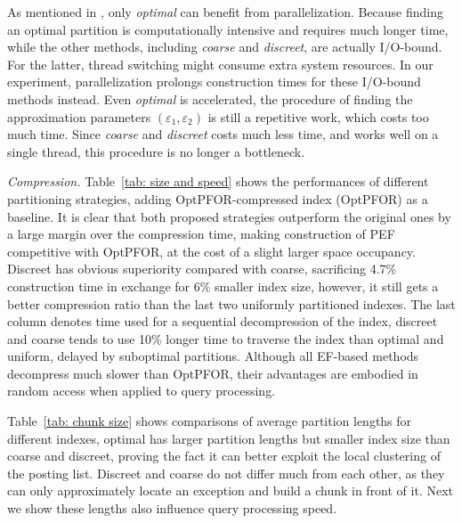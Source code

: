 \documentclass[runningheads,a4paper]{llncs}
\begin{document}
As mentioned in \cite{ottaviano2014partitioned}, only \textit{optimal} can benefit from parallelization.
Because finding an optimal partition is computationally intensive and requires much longer time, while the other methods, including \textit{coarse} and \textit{discreet}, are actually I/O-bound.
For the latter, thread switching might consume extra system resources.
In our experiment, parallelization prolongs construction times for these I/O-bound methods instead.
Even \textit{optimal} is accelerated, the procedure of finding the approximation parameters $ \left( \varepsilon_1, \varepsilon_2 \right) $ is still a repetitive work, which costs too much time.
Since \textit{coarse} and \textit{discreet} costs much less time, and works well on a single thread, this procedure is no longer a bottleneck.

\textit{Compression.} Table~\ref{tab: size and speed} shows the performances of different partitioning strategies, adding OptPFOR-compressed index (OptPFOR) as a baseline. It is clear that both proposed strategies outperform the original ones by a large margin over the compression time, making construction of PEF competitive with OptPFOR, at the cost of a slight larger space occupancy. Discreet has obvious superiority compared with coarse, sacrificing 4.7\% construction time in exchange for 6\% smaller index size, however, it still gets a better compression ratio than the last two uniformly partitioned indexes. The last column denotes time used for a sequential decompression of the index, discreet and coarse tends to use 10\% longer time to traverse the index than optimal and uniform, delayed by suboptimal partitions. Although all EF-based methods decompress much slower than OptPFOR, their advantages are embodied in random access when applied to query processing.

Table~\ref{tab: chunk size} shows comparisons of average partition lengths for different indexes, optimal has larger partition lengths but smaller index size than coarse and discreet, proving the fact it can better exploit the local clustering of the posting list. Discreet and coarse do not differ much from each other, as they can only approximately locate an exception and build a chunk in front of it. Next we show these lengths also influence query processing speed.
\end{document}
